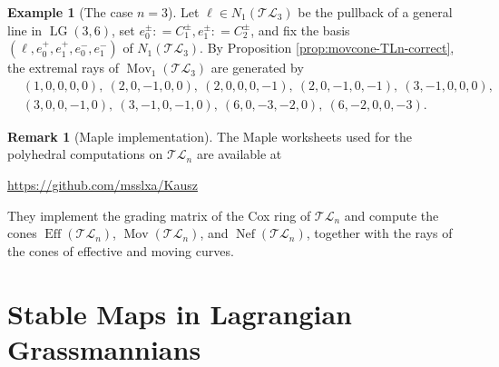 \documentclass[10pt]{amsart}
\theoremstyle{definition}
\newtheorem{remark}[theorem]{Remark}
\newtheorem{example}[theorem]{Example}
\newcommand{\Eff}{\operatorname{Eff}}
\newcommand{\Nef}{\operatorname{Nef}}
\newcommand{\Mov}{\operatorname{Mov}}
\newcommand{\LG}{\operatorname{LG}}
\DeclareMathOperator{\mult}{mult}
\newcommand{\TL}{\mathcal{TL}}
\theoremstyle{plain} %
\begin{document}
\begin{example}[The case $n=3$]
Let $\ell\in N_1(\TL_3)$ be the pullback of a general line in $\LG(3,6)$, set $e_0^{\pm}: = C_1^{\pm}, e_1^{\pm}: = C_2^{\pm}$, and fix the basis $(\ell,e_0^+,e_1^+,e_0^-,e_1^-)$ of $N_1(\TL_3)$. By Proposition \ref{prop:movcone-TLn-correct}, the extremal rays of $\Mov_1(\TL_3)$ are generated by 
\begin{equation}
\begin{aligned}
&(1,0,0,0,0),\ (2, 0, -1, 0, 0),\ (2, 0, 0, 0, -1),\ (2,0,-1,0,-1),\ (3, -1, 0, 0, 0),\\
&(3, 0, 0, -1, 0),\ (3, -1, 0, -1, 0),\ (6, 0, -3, -2, 0),\ (6, -2, 0, 0, -3).
\end{aligned}
\end{equation}
\end{example}

\begin{remark}[Maple implementation]\label{Maple}
The Maple worksheets used for the polyhedral computations on $\TL_n$ are available at
\begin{center}
\url{https://github.com/msslxa/Kausz}
\end{center}
They implement the grading matrix of the Cox ring of $\TL_n$ and compute the cones
$\Eff(\TL_n)$, $\Mov(\TL_n)$, and $\Nef(\TL_n)$, together with the rays of the cones of effective and moving curves.

    
\end{remark}

\section{Stable Maps in Lagrangian Grassmannians}\label{Sec3}
\end{document}
